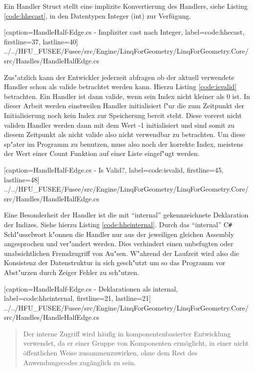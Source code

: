 \documentclass[pagesize, paper=a4, fontsize=12pt,titlepage=true, headings=small, headnosepline, abstractoff, liststotoc, nochapterprefix, plainheadsepline]{scrreprt}
\newcommand{\CSS}{C\texttt{\# }}
\begin{document}
Ein Handler Struct stellt eine implizite Konvertierung des Handlers, siehe Listing \ref{code:hhecast}, in den Datentypen Integer (int) zur Verfügung.

			[caption={HandleHalf-Edge.cs - Impliziter cast nach Integer}, label=code:hhecast, firstline=37, lastline=40]
			{../../HFU_FUSEE/Fusee/src/Engine/LinqForGeometry/LinqForGeometry.Core/src/Handles/HandleHalfEdge.cs}

Zus"atzlich kann der Entwickler jederzeit abfragen ob der aktuell verwendete Handler schon als valide betrachtet werden kann. Hierzu Listing \ref{code:isvalid} betrachten. Ein Handler ist dann valide, wenn sein Index nicht kleiner als 0 ist. In dieser Arbeit werden einstweilen Handler initialisiert f"ur die zum Zeitpunkt der Initialisierung noch kein Index zur Speicherung bereit steht. Diese vorerst nicht validen Handler werden dann mit dem Wert -1 initialisiert und sind somit zu diesem Zeitpunkt als nicht valide also nicht verwendbar zu betrachten. Um diese sp"ater im Programm zu benutzen, muss also noch der korrekte Index, meistens der Wert einer Count Funktion auf einer Liste eingef"ugt werden.

			[caption={HandleHalf-Edge.cs - Is Valid?}, label=code:isvalid, firstline=45, lastline=48]
			{../../HFU_FUSEE/Fusee/src/Engine/LinqForGeometry/LinqForGeometry.Core/src/Handles/HandleHalfEdge.cs}

Eine Besonderheit der Handler ist die mit "`internal"' gekennzeichnete Deklaration der Indizes. Siehe hierzu Listing \ref{code:hheinternal}. Durch das "`internal"' \CSS Schl"usselwort k"onnen die Handler nur aus der jeweiligen gleichen Assembly angesprochen und ver"andert werden. Dies verhindert einen unbefugten oder unabsichtlichen Fremdzugriff von Au"sen. W"ahrend der Laufzeit wird also die Konsistenz der Datenstruktur in sich gesch"utzt um so das Programm vor Abst"urzen durch Zeiger Fehler zu sch"utzen.

			[caption={HandleHalf-Edge.cs - Deklarationen als internal}, label=code:hheinternal, firstline=21, lastline=21]
			{../../HFU_FUSEE/Fusee/src/Engine/LinqForGeometry/LinqForGeometry.Core/src/Handles/HandleHalfEdge.cs}

\begin{quote}{\dq}Der interne Zugriff wird h{\"a}ufig in komponentenbasierter Entwicklung verwendet, da er einer Gruppe von Komponenten erm{\"o}glicht, in einer nicht {\"o}ffentlichen Weise zusammenzuwirken, ohne dem Rest des Anwendungscodes zug{\"a}nglich zu sein.{\dq} \cite{MicrosoftCReferenz.2013}\end{quote}
\end{document}

